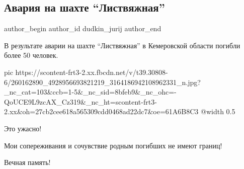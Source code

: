  
 
 
 
 
 
\subsection{Авария на шахте \enquote{Листвяжная}}
\label{sec:26_11_2021.fb.dudkin_jurij.1.avaria_na_shahte}
 
\ifcmt
 author_begin
   author_id dudkin_jurij
 author_end
\fi

В результате аварии на шахте \enquote{Листвяжная} в Кемеровской области погибли более
50 человек.

\ifcmt
  pic https://scontent-frt3-2.xx.fbcdn.net/v/t39.30808-6/260162890_4928956693821219_3164186942108962331_n.jpg?_nc_cat=103&ccb=1-5&_nc_sid=8bfeb9&_nc_ohc=-QoUCE9L9zcAX_Cz319&_nc_ht=scontent-frt3-2.xx&oh=27cb2cee618a565309cdd0468ad22dc7&oe=61A6B8C3
  @width 0.5
\fi

Это ужасно!

Мои сопереживания и сочувствие родным погибших не имеют границ!

Вечная память!

